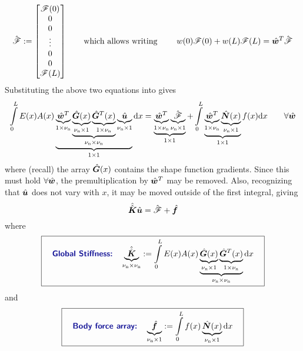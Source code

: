 \begin{equation}
  \hat{\bm{\mathscr{F}}}:=
\begin{bmatrix}
\mathscr{F}(0) \\
0 \\
0 \\
\vdots\\
0 \\
0 \\
\mathscr{F}(L)
\end{bmatrix}
\qquad\text{which allows writing }\qquad
w(0)\mathscr{F}(0)+w(L)\mathscr{F}(L)=\hat{\bm{w}}^T\hat{\bm{\mathscr{F}}}
\end{equation}
Substituting the above two equations into  gives
\begin{equation}
 \int\limits_0^L E(x)A(x) 
\underbrace{
	\underbrace{
           \hat{\bm{w}}^T
   }_{1\times{\nu_\text{n}}}
	\underbrace{
	      \underbrace{
              \hat{\bm{G}}(x)
          }_{{\nu_\text{n}}\times1}
	     \underbrace{
            \hat{\bm{G}}^T(x)
          }_{1\times{\nu_\text{n}}}
	}_{{\nu_\text{n}}\times{\nu_\text{n}}}
	\underbrace{\hat{\bm{u}}}_{{\nu_\text{n}}\times1}
}_{1\times1} 
\mathrm{d} x 
= 
\underbrace{\underbrace{\hat{\bm{w}}^T}_{1\times{\nu_\text{n}}}\underbrace{\hat{\bm{\mathscr{F}}}}_{{\nu_\text{n}}\times1}}_{1\times1}
+  \int\limits_0^L \underbrace{\underbrace{\hat{\bm{w}}^T}_{1\times{\nu_\text{n}}}\underbrace{\hat{\bm{N}}(x)}_{{\nu_\text{n}}\times1}}_{1\times1}f(x)
\mathrm{d} x
 \qquad\forall\hat{\bm{w}}
\label{eq:LinearBarWeakFormWithForces}
\end{equation}
where (recall) the array $\hat{\bm{G}}(x)$ contains the shape function gradients.
Since this must hold $\forall\hat{\bm{w}}$, the premultiplication by $\hat{\bm{w}}^T$ may be removed. Also, recognizing that $\hat{\bm{u}}$ does not vary with $x$, it may be moved outside of the first integral, giving
\begin{equation}
\hat{\hat{\bm{K}}}\hat{\bm{u}}
=
\hat{\bm{\mathscr{F}}}  
+  \hat{\bm{f}}
\label{eq:LinearBarWeakFormDiscr}
\end{equation}
where
\begin{equation}
\boxit{\quad
\text{\Defn{Global Stiffness:}}\quad
  \underbrace{\AArray{K}}_{\numnodes\by\numnodes}\definedEqual\int\limits_0^L E(x)A(x)  \underbrace{\underbrace{\gradNBFa(x)}_{\numnodes\by1} \underbrace{\gradNBFa^T(x)}_{1\by\numnodes}}_{\numnodes\by\numnodes} \dd x
\quad}
\label{eq:linearBarGlobalStiffness}
\end{equation}
and
\begin{equation}
\boxit{\quad
\text{\Defn{Body force array:}}\quad
  \underbrace{\Array{f}}_{\numnodes\by1}
\definedEqual
\int\limits_0^L f(x)\underbrace{\NBFa(x)}_{\numnodes\by1}\dd x
\quad}
\label{eq:linearBarBodyForceArray}
\end{equation}

